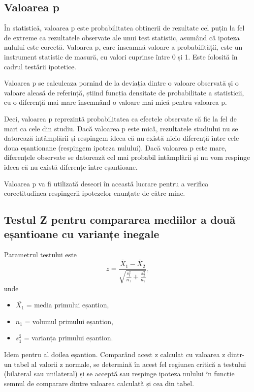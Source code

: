 \subsection{Valoarea p}

În statistică, valoarea p este probabilitatea obținerii de rezultate cel puțin la fel de extreme ca rezultatele observate ale unui test statistic, asumând că ipoteza nulului este corectă. Valoarea p, care inseamnă valoare a probabilității, este un instrument statistic de masură, cu valori cuprinse între 0 și 1. Este folosită în cadrul testării ipotetice. 

Valoarea p se calculeaza pornind de la deviația dintre o valoare observată și o valoare aleasă de referință, știind funcția densitate de probabilitate a statisticii, cu o diferență mai mare însemnând o valoare mai mică pentru valoarea p. 

Deci, valoarea p reprezintă probabilitatea ca efectele observate să fie la fel de mari ca cele din studiu. Dacă valoarea p este mică, rezultatele studiului nu se datorează intâmplării și respingem ideea că nu există nicio diferență între cele doua eșantionane (respingem ipoteza nulului). Dacă valoarea p este mare, diferențele observate se datorează cel mai probabil intâmplării și nu vom respinge ideea că nu există diferențe între eșantioane.

Valoarea p va fi utilizată deseori în această lucrare pentru a verifica corectitudinea respingerii ipotezelor enunțate de către mine.

\subsection{Testul Z pentru compararea mediilor a două eșantioane cu varianțe inegale}

Parametrul testului este
\[
z = \frac{\bar{X}_1 - \bar{X}_2}{\sqrt{\frac{s_1^2}{n_1} + \frac{s_2^2}{n_2}}},
\]
unde
\begin{itemize}
    \item $\bar{X_1}$ = media primului eșantion,
    \item $n_1$ = volumul primului eșantion,
    \item $s_1^2$ = varianța primului eșantion.
\end{itemize}
Idem pentru al doilea eșantion.
Comparând acest z calculat cu valoarea z dintr-un tabel al valorii z normale, se determină în acest fel regiunea critică a testului (bilateral sau unilateral) și se acceptă sau respinge ipoteza nulului în funcție semnul de comparare dintre valoarea calculată și cea din tabel.

